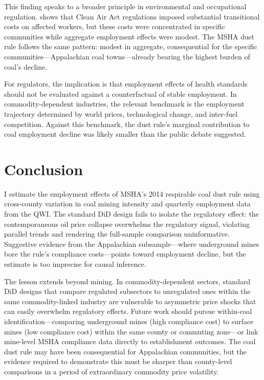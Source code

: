 \documentclass[12pt]{article}
\begin{document}
This finding speaks to a broader principle in environmental and occupational regulation. \citet{walker2013transitional} shows that Clean Air Act regulations imposed substantial transitional costs on affected workers, but these costs were concentrated in specific communities while aggregate employment effects were modest. The MSHA dust rule follows the same pattern: modest in aggregate, consequential for the specific communities---Appalachian coal towns---already bearing the highest burden of coal's decline.

For regulators, the implication is that employment effects of health standards should not be evaluated against a counterfactual of stable employment. In commodity-dependent industries, the relevant benchmark is the employment trajectory determined by world prices, technological change, and inter-fuel competition. Against this benchmark, the dust rule's marginal contribution to coal employment decline was likely smaller than the public debate suggested.


\section{Conclusion}
\label{sec:conclusion}

I estimate the employment effects of MSHA's 2014 respirable coal dust rule using cross-county variation in coal mining intensity and quarterly employment data from the QWI. The standard DiD design fails to isolate the regulatory effect: the contemporaneous oil price collapse overwhelms the regulatory signal, violating parallel trends and rendering the full-sample comparison uninformative. Suggestive evidence from the Appalachian subsample---where underground mines bore the rule's compliance costs---points toward employment decline, but the estimate is too imprecise for causal inference.

The lesson extends beyond mining. In commodity-dependent sectors, standard DiD designs that compare regulated subsectors to unregulated ones within the same commodity-linked industry are vulnerable to asymmetric price shocks that can easily overwhelm regulatory effects. Future work should pursue within-coal identification---comparing underground mines (high compliance cost) to surface mines (low compliance cost) within the same county or commuting zone---or link mine-level MSHA compliance data directly to establishment outcomes. The coal dust rule may have been consequential for Appalachian communities, but the evidence required to demonstrate this must be sharper than county-level comparisons in a period of extraordinary commodity price volatility.
\end{document}

